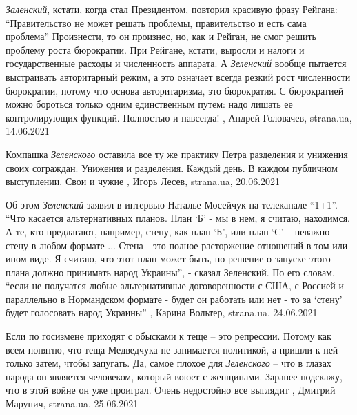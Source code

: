 \emph{Заленский}, кстати, когда стал Президентом, повторил красивую фразу Рейгана:
\enquote{Правительство не может решать проблемы, правительство и есть сама
проблема} Произнести, то он произнес, но, как и Рейган, не смог решить проблему
роста бюрократии. При Рейгане, кстати, выросли и налоги и государственные
расходы и численность аппарата. А \emph{Зеленский} вообще пытается выстраивать
авторитарный режим, а это означает всегда резкий рост численности бюрократии,
потому что основа авторитаризма, это бюрократия. С бюрократией можно бороться
только одним единственным путем: надо лишать ее контролирующих функций.
Полностью и навсегда!
, 
Андрей Головачев, strana.ua, 14.06.2021

Компашка \emph{Зеленского} оставила все ту же практику Петра разделения и
унижения своих сограждан. Унижения и разделения. Каждый день. В каждом
публичном выступлении. Свои и чужие
, 
Игорь Лесев, strana.ua, 20.06.2021

Об этом \emph{Зеленский} заявил в интервью Наталье Мосейчук на телеканале \enquote{1+1}.  \enquote{Что
касается альтернативных планов. План \enquote{Б} - мы в нем, я считаю, находимся. А те,
кто предлагают, например, стену, как план \enquote{Б}, или план \enquote{С} – неважно - стену в
любом формате ... Стена - это полное расторжение отношений в том или ином виде. Я
считаю, что этот план может быть, но решение о запуске этого плана должно
принимать народ Украины}, - сказал Зеленский.  По его словам, \enquote{если не
получатся любые альтернативные договоренности с США, с Россией и параллельно в
Нормандском формате - будет он работать или нет - то за \enquote{стену} будет
голосовать народ Украины}
, Карина Вольтер, strana.ua, 24.06.2021

Если по госизмене приходят с обысками к теще – это репрессии. Потому как всем
понятно, что теща Медведчука не занимается политикой, а пришли к ней только
затем, чтобы запугать.  Да, самое плохое для \emph{Зеленского} – что в глазах
народа он является человеком, который воюет с женщинами. Заранее подскажу, что
в этой войне он уже проиграл.  Очень недостойно все выглядит
, 
Дмитрий Марунич, strana.ua, 25.06.2021

